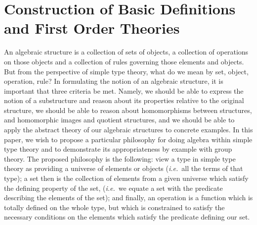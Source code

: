 \section{Construction of Basic Definitions and First Order Theories}

An algebraic structure is a collection of sets of objects, a
collection of operations on those objects and a collection of rules
governing those elements and objects.  But from the perspective of
simple type theory, what do we mean by set, object, operation, rule?
In formulating the notion of an algebraic structure, it is important
that three criteria be met.  Namely, we should be able to express the
notion of a substructure and reason about its properties relative to
the original structure, we should be able to reason about
homomorphisms between structures, and homomorphic images and quotient
structures, and we should be able to apply the abstract theory of our
algebraic structures to concrete examples.  In this paper, we wish to
propose a particular philosophy for doing algebra within simple type
theory and to demonstrate its appropriateness by example with group
theory.  The proposed philosophy is the following: view a type in
simple type theory as providing a universe of elements or objects
({\it i.e.}~all the terms of that type); a set then is the collection of
elements from a given universe which satisfy the defining property
of the set, ({\it i.e.}~we equate a set with the predicate describing the
elements of the set); and finally, an operation is a function which is
totally defined on the whole type, but which is constrained to satisfy
the necessary conditions on the elements which satisfy the predicate
defining our set.

